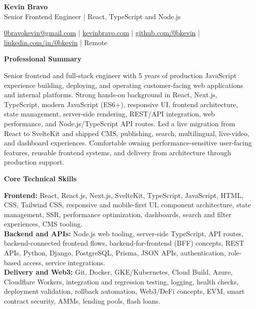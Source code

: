 \documentclass[10pt]{article}
\newcommand{\sectiontitle}[1]{%
    \vspace{3pt}
    \begin{center}
        \textbf{#1}
    \end{center}
    \vspace{-5pt}
}
\begin{document}
\raggedright

\begin{center}
    {\LARGE \textbf{Kevin Bravo}}\\
    Senior Frontend Engineer | React, TypeScript and Node.js \\
    \hrulefill
\end{center}

\begin{center}
    \href{mailto:0bravokevin@gmail.com}{0bravokevin@gmail.com}
    | \href{https://kevinbravo.com}{kevinbravo.com}
    | \href{https://github.com/0bkevin}{github.com/0bkevin}
    | \href{https://www.linkedin.com/in/0bkevin/}{linkedin.com/in/0bkevin}
    | Remote
\end{center}

\fontsize{9.75}{10.8}\selectfont

\sectiontitle{Professional Summary}
Senior frontend and full-stack engineer with 5 years of production JavaScript experience building, deploying, and operating customer-facing web applications and internal platforms. Strong hands-on background in React, Next.js, TypeScript, modern JavaScript (ES6+), responsive UI, frontend architecture, state management, server-side rendering, REST/API integration, web performance, and Node.js/TypeScript API routes. Led a live migration from React to SvelteKit and shipped CMS, publishing, search, multilingual, live-video, and dashboard experiences. Comfortable owning performance-sensitive user-facing features, reusable frontend systems, and delivery from architecture through production support.

\sectiontitle{Core Technical Skills}
\textbf{Frontend:} React, React.js, Next.js, SvelteKit, TypeScript, JavaScript, HTML, CSS, Tailwind CSS, responsive and mobile-first UI, component architecture, state management, SSR, performance optimization, dashboards, search and filter experiences, CMS tooling. \\
\textbf{Backend and APIs:} Node.js web tooling, server-side TypeScript, API routes, backend-connected frontend flows, backend-for-frontend (BFF) concepts, REST APIs, Python, Django, PostgreSQL, Prisma, JSON APIs, authentication, role-based access, service integrations. \\
\textbf{Delivery and Web3:} Git, Docker, GKE/Kubernetes, Cloud Build, Azure, Cloudflare Workers, integration and regression testing, logging, health checks, deployment validation, rollback automation, Web3/DeFi concepts, EVM, smart contract security, AMMs, lending pools, flash loans.
\end{document}

